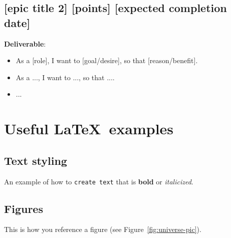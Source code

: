 \documentclass{article}
\begin{document}
\subsection{[epic title 2] [points] [expected completion date]}
\textbf{Deliverable}: 

\begin{itemize}
\item As a [role], I want to [goal/desire], so that [reason/benefit].
\item As a ..., I want to ..., so that ....
\item ...
\end{itemize}

\pagebreak





 \appendix
 \section{Useful \LaTeX ~examples}
 
 \subsection{Text styling}
An example of how to \texttt{create text} that is \textbf{bold} or \textit{italicized}. 

 \subsection{Figures}
This is how you reference a figure (see Figure~\ref{fig:universe-pic}).
\end{document}
